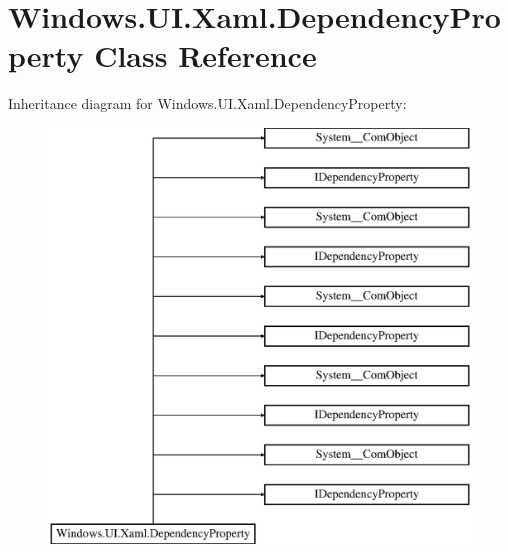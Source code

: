 \hypertarget{class_windows_1_1_u_i_1_1_xaml_1_1_dependency_property}{}\section{Windows.\+U\+I.\+Xaml.\+Dependency\+Property Class Reference}
\label{class_windows_1_1_u_i_1_1_xaml_1_1_dependency_property}
Inheritance diagram for Windows.\+U\+I.\+Xaml.\+Dependency\+Property\+:\begin{figure}[H]
\begin{center}
\leavevmode
\includegraphics[height=11.000000cm]{class_windows_1_1_u_i_1_1_xaml_1_1_dependency_property}
\end{center}
\end{figure}
